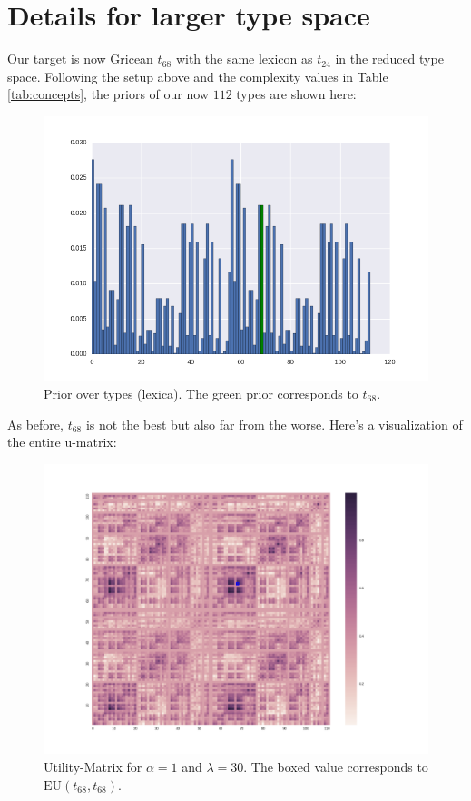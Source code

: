 \documentclass[a4paper]{article}
\begin{document}
\newpage

\section*{Details for larger type space}

Our target is now Gricean $t_{68}$ with the same lexicon as $t_{24}$ in the reduced type space. Following the setup above and the complexity values in Table \ref{tab:concepts}, the priors of our now $112$ types are shown here:

\begin{figure}[h!]
  \centering
  \includegraphics[scale=.35]{../code-LOT-extension/plots/priors-meFalse.png} %
  \caption{Prior over types (lexica). The green prior corresponds to $t_{68}$.}
  \label{fig:priors}
\end{figure}

As before,  $t_{68}$ is not the best but also far from the worse. Here's a visualization of the entire u-matrix:

\begin{figure}[h!]
  \centering
  \includegraphics[scale=.25]{../code-LOT-extension/plots/u-l30-a1-meFalse.png} %
  \caption{Utility-Matrix for $\alpha = 1$ and $\lambda = 30$. The boxed value corresponds to $\text{EU}(t_{68},t_{68})$.}
  \label{fig:u-matrix}
\end{figure}
\end{document}
